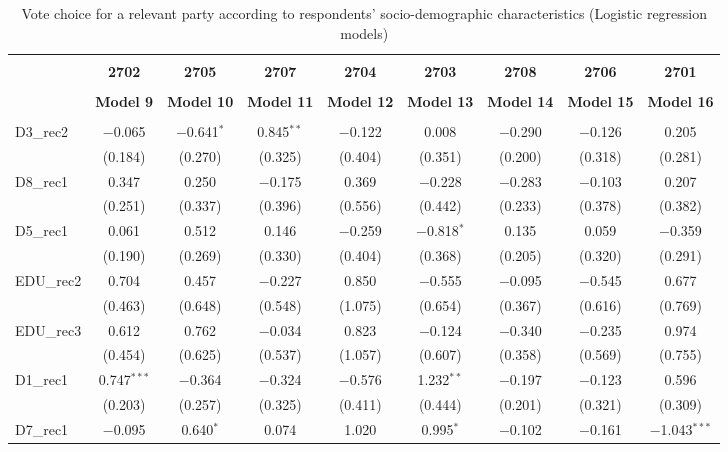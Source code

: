 \documentclass[
]{article}
\begin{document}
\begin{table}[!htbp] \centering 
  \caption{Vote choice for a relevant party according to respondents' 
                       socio-demographic characteristics (Logistic regression models)} 
  \label{table:full_logit_se} 
\begin{tabular}{@{\extracolsep{5pt}}lcccccccc} 
\\[-1.8ex]\hline \\[-1.8ex] 
 & \textbf{2702} & \textbf{2705} & \textbf{2707} & \textbf{2704} & \textbf{2703} & \textbf{2708} & \textbf{2706} & \textbf{2701} \\ 
\\[-1.8ex] & \textbf{Model 9} & \textbf{Model 10} & \textbf{Model 11} & \textbf{Model 12} & \textbf{Model 13} & \textbf{Model 14} & \textbf{Model 15} & \textbf{Model 16}\\ 
\hline \\[-1.8ex] 
 D3\_rec2 & $-$0.065 & $-$0.641$^{*}$ & 0.845$^{**}$ & $-$0.122 & 0.008 & $-$0.290 & $-$0.126 & 0.205 \\ 
  & (0.184) & (0.270) & (0.325) & (0.404) & (0.351) & (0.200) & (0.318) & (0.281) \\ 
  D8\_rec1 & 0.347 & 0.250 & $-$0.175 & 0.369 & $-$0.228 & $-$0.283 & $-$0.103 & 0.207 \\ 
  & (0.251) & (0.337) & (0.396) & (0.556) & (0.442) & (0.233) & (0.378) & (0.382) \\ 
  D5\_rec1 & 0.061 & 0.512 & 0.146 & $-$0.259 & $-$0.818$^{*}$ & 0.135 & 0.059 & $-$0.359 \\ 
  & (0.190) & (0.269) & (0.330) & (0.404) & (0.368) & (0.205) & (0.320) & (0.291) \\ 
  EDU\_rec2 & 0.704 & 0.457 & $-$0.227 & 0.850 & $-$0.555 & $-$0.095 & $-$0.545 & 0.677 \\ 
  & (0.463) & (0.648) & (0.548) & (1.075) & (0.654) & (0.367) & (0.616) & (0.769) \\ 
  EDU\_rec3 & 0.612 & 0.762 & $-$0.034 & 0.823 & $-$0.124 & $-$0.340 & $-$0.235 & 0.974 \\ 
  & (0.454) & (0.625) & (0.537) & (1.057) & (0.607) & (0.358) & (0.569) & (0.755) \\ 
  D1\_rec1 & 0.747$^{***}$ & $-$0.364 & $-$0.324 & $-$0.576 & 1.232$^{**}$ & $-$0.197 & $-$0.123 & 0.596 \\ 
  & (0.203) & (0.257) & (0.325) & (0.411) & (0.444) & (0.201) & (0.321) & (0.309) \\ 
  D7\_rec1 & $-$0.095 & 0.640$^{*}$ & 0.074 & 1.020 & 0.995$^{*}$ & $-$0.102 & $-$0.161 & $-$1.043$^{***}$ \\ 

\end{tabular}
\end{table}
\end{document}
